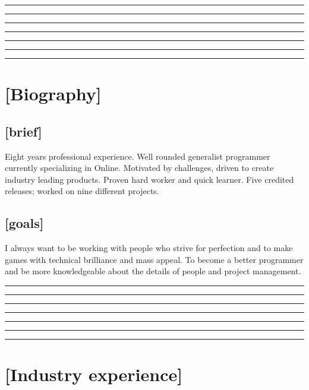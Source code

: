 \documentclass[a4paper]{res}
\newcommand{\setrule}[1]{\rule{#1}{1mm}}
\newcommand{\fibrule}[2]{ \hspace{#1}  \setrule{#2} \setrule{21mm} \setrule{13mm} \setrule{8mm} \setrule{5mm} \setrule{3mm} \setrule{2mm}  \vspace{-.52in} }
\begin{document}
 
\thispagestyle{empty} %
\address{}
\begin{resume}


\fibrule{0.9in}{3.0in}
\section{[Biography]} 

\vspace{-.12in}

\subsection{[brief]}
\mbox{}
\vspace{-.12in}

Eight years professional experience.
Well rounded generalist programmer currently specializing in Online.
Motivated by challenges, driven to create industry leading products.
Proven hard worker and quick learner.
Five credited releases; worked on nine different projects.  

\vspace{-.22in}

\subsection{[goals]}
\mbox{}
\vspace{-.12in}

I always want to be working with people who strive for perfection and to make games with technical brilliance and mass appeal. To become a better programmer and be more knowledgeable about the details of people and project management.


\fibrule{2.15in}{1.75in}
\section{[Industry experience]}


\end{resume}
\end{document}
